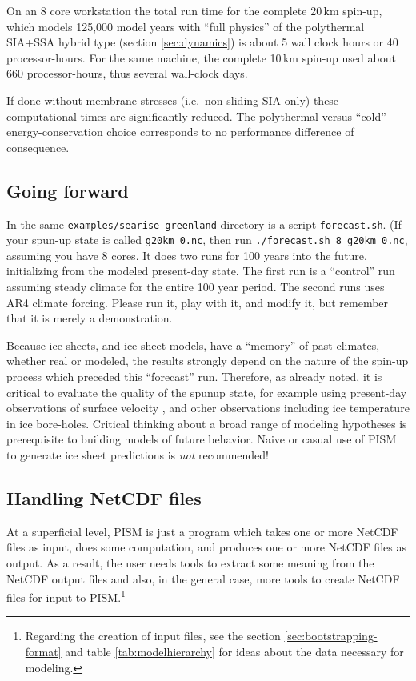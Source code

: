 On an 8 core workstation the total run time for the complete 20\,km spin-up, which models 125,000 model years with ``full physics'' of the polythermal SIA+SSA hybrid type (section \ref{sec:dynamics}) is about 5 wall clock hours or 40 processor-hours.  For the same machine, the complete 10\,km spin-up used about 660 processor-hours, thus several wall-clock days.

If done without membrane stresses (i.e.~non-sliding SIA only) these computational times are significantly reduced.  The polythermal versus ``cold'' energy-conservation choice corresponds to no performance difference of consequence.


\subsection{Going forward}  \label{subsect:forecastcaution}  In the same \verb|examples/searise-greenland| directory is a script \verb|forecast.sh|.  (If your spun-up state is called \texttt{g20km_0.nc}, then run  \verb|./forecast.sh 8 g20km_0.nc|, assuming you have 8 cores.  It does two runs for 100 years into the future, initializing from the modeled present-day state. The first run is a ``control''  run assuming steady climate for the entire 100 year period. The second runs uses AR4 climate forcing. Please run it, play with it, and modify it, but remember that it is merely a demonstration.

Because ice sheets, and ice sheet models, have a ``memory'' of past climates, whether real or modeled, the results strongly depend on the nature of the spin-up process which preceded this ``forecast'' run.  Therefore, as already noted, it is critical to evaluate the quality of the spunup state, for example using present-day observations of surface velocity \cite{BKAJS}, and other observations including ice temperature in ice bore-holes.  Critical thinking about a broad range of modeling hypotheses is prerequisite to building models of future behavior.  Naive or casual use of PISM to generate ice sheet predictions is \emph{not} recommended!


\subsection{Handling NetCDF files}\label{subsect:nctoolsintro}  At a superficial level, PISM is just a program which takes one or more NetCDF files as input, does some computation, and produces one or more NetCDF files as output.  As a result, the user needs tools to extract some meaning from the NetCDF output files and also, in the general case, more tools to create NetCDF files for input to PISM.\footnote{Regarding the creation of input files, see the section \ref{sec:bootstrapping-format} and table \ref{tab:modelhierarchy} for ideas about the data necessary for modeling.}

